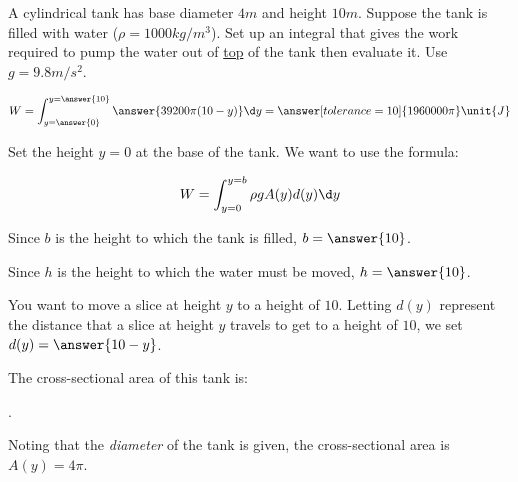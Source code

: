 \documentclass{ximera}
\author{Jim Talamo and Alex Beckwith}
\begin{document}
\begin{exercise}

A cylindrical tank has base diameter $4\unit{m}$ and height
$10\unit{m}$. Suppose the tank is filled with water ($\rho=1000
\unit{kg}/\unit{m}^3$). Set up an integral that gives the work
required to pump the water out of \underline{top} of the tank then evaluate it.  Use
$g=9.8 \unit{m}/\unit{s}^2$.

\begin{image}
\end{image}

\[
W= \int_{y=\answer{0}}^{y=\answer{10}} \answer{39200\pi (10-y)}\d y = \answer[tolerance=10]{1960000\pi} \unit{J}
\]
\begin{hint}
Set the height $y=0$ at the base of the tank.  We want to use the
formula:

\[ 
W = \int_{y=0}^{y=b} \rho g A(y) d(y) \d y
\]

Since $b$ is the height to which the tank is filled, $b=\answer{10}$.

Since $h$ is the height to which the water must be moved,
$h=\answer{10}$.

You want to move a slice at height $y$ to a height of $10$. Letting
$d(y)$ represent the distance that a slice at height $y$ travels to
get to a height of $10$, we set $d(y) = \answer{10-y}$.

The cross-sectional area of this tank is:

\begin{multipleChoice}
.
\end{multipleChoice}

\begin{question}
Noting that the \emph{diameter} of the tank is given, the cross-sectional area is $A(y) = 4 \pi$.
\end{question}
\end{hint}
\end{exercise}
\end{document}
